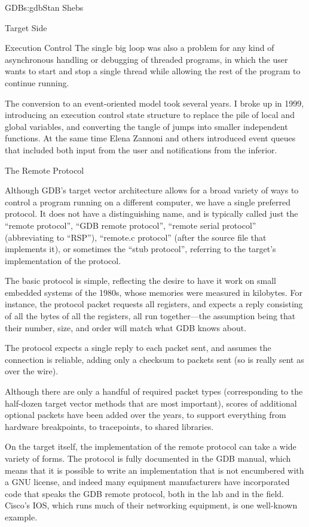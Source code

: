 \begin{aosachapter}{GDB}{s:gdb}{Stan Shebs}
\begin{aosasect1}{Target Side}
\begin{aosasect2}{Execution Control}
The single big loop was also a problem for any kind of asynchronous
handling or debugging of threaded programs, in which the user wants to
start and stop a single thread while allowing the rest of the program
to continue running.

The conversion to an event-oriented model took several years.  I broke
up  in 1999, introducing an execution
control state structure to replace the pile of local and global
variables, and converting the tangle of jumps into smaller independent
functions.  At the same time Elena Zannoni and others introduced event
queues that included both input from the user and notifications from
the inferior.

\end{aosasect2}

\begin{aosasect2}{The Remote Protocol}

Although GDB's target vector architecture allows for a broad variety
of ways to control a program running on a different computer, we have
a single preferred protocol.  It does not have a distinguishing name,
and is typically called just the ``remote protocol'', ``GDB remote
protocol'', ``remote serial protocol'' (abbreviating to ``RSP''),
``remote.c protocol'' (after the source file that implements it), or
sometimes the ``stub protocol'', referring to the target's
implementation of the protocol.

The basic protocol is simple, reflecting the desire to have it work on
small embedded systems of the 1980s, whose memories were measured in
kilobytes.  For instance, the protocol packet  requests all
registers, and expects a reply consisting of all the bytes of all the
registers, all run together---the assumption being that their number,
size, and order will match what GDB knows about.

The protocol expects a single reply to each packet sent, and assumes
the connection is reliable, adding only a checksum to packets sent
(so  is really sent as  over the wire).

Although there are only a handful of required packet types
(corresponding to the half-dozen target vector methods that are most
important), scores of additional optional packets have been added over
the years, to support everything from hardware breakpoints, to
tracepoints, to shared libraries.

On the target itself, the implementation of the remote protocol can
take a wide variety of forms.  The protocol is fully documented in the
GDB manual, which means that it is possible to write an implementation
that is not encumbered with a GNU license, and indeed many equipment
manufacturers have incorporated code that speaks the GDB remote
protocol, both in the lab and in the field.  Cisco's IOS, which runs much
of their networking equipment, is one well-known example.


\end{aosasect2}
\end{aosasect1}
\end{aosachapter}
